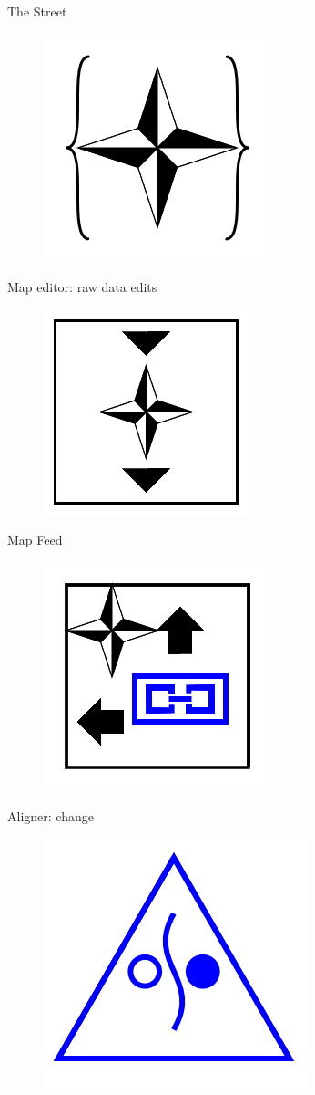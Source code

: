 \documentclass[11pt]{article}
\begin{document}
The Street
\begin{figure}
\includegraphics[scale=0.3]{image11.png}
\end{figure}
Map editor: raw data edits
\begin{figure}
\includegraphics[scale=0.3]{image12.png}
\end{figure}
Map Feed
\begin{figure}
\includegraphics[scale=0.3]{image13.png}
\end{figure}
Aligner: change
\begin{figure}
\includegraphics[scale=0.3]{image14.png}
\end{figure}
\end{document}

